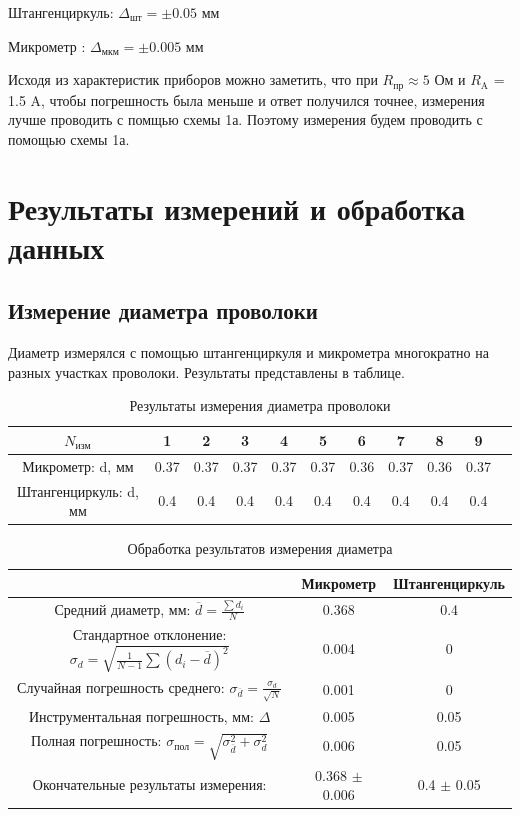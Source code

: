 \documentclass[a4paper,12pt]{article}
\begin{document}
Штангенциркуль: $\Delta_{\mbox{шт}} = \pm 0.05$ мм

Микрометр : $\Delta_{\mbox{мкм}} = \pm 0.005$ мм

Исходя из характеристик приборов можно заметить, что при $R_{\mbox{пр}}
\approx 5$ Ом и $R_{\mbox{A}}$ = 1.5 A, чтобы погрешность была меньше и ответ получился точнее, измерения лучше проводить с помщью схемы 1а.
Поэтому измерения будем проводить с помощью схемы 1а.

\section{Результаты измерений и обработка данных}
\subsection{Измерение диаметра проволоки}
Диаметр измерялся с помощью штангенциркуля и микрометра многократно на разных участках проволоки. Результаты представлены в таблице.
\begin{table}[H]
\label{Диаметр}
\caption{Результаты измерения диаметра проволоки}
\begin{tabular}{|c|c|c|c|c|c|c|c|c|c|c|}
\hline
$N_{\mbox{изм}}$ & 1 & 2 & 3 & 4 & 5 & 6 & 7 & 8 & 9\\
\hline
Микрометр: d, мм & 0.37 & 0.37 & 0.37 & 0.37 & 0.37 & 0.36 & 0.37 & 0.36 & 0.37 \\
\hline
Штангенциркуль: d, мм & 0.4 & 0.4 & 0.4 & 0.4 & 0.4 & 0.4 & 0.4 & 0.4 & 0.4 \\
\hline
\end{tabular}
\end{table}

\begin{table}[H]
\centering
\caption{Обработка результатов измерения диаметра}
\begin{tabular}{|c|c|c|}
\hline
 & Микрометр & Штангенциркуль \\
\hline
Средний диаметр, мм: $\overline{d}=\frac{\sum d_i}{N}$ & 0.368 & 0.4 \\
\hline
Стандартное отклонение: $\sigma_d=\sqrt{\frac{1}{N-1}\sum (d_i-\overline{d})^2}$ & 0.004&0 \\
\hline
Случайная погрешность среднего: $\sigma_{\overline{d}}=\frac{\sigma_d}{\sqrt{N}}$ & 0.001 & 0 \\
\hline
Инструментальная погрешность, мм: $\Delta$ & 0.005 & 0.05 \\
\hline
Полная погрешность: $\sigma_{\mbox{пол}}=\sqrt{\sigma_{\overline{d}}^2+\sigma_d^2}$ & 0.006 & 0.05 \\
\hline
Окончательные результаты измерения:  & 0.368 $\pm$ 0.006 & 0.4 $\pm$ 0.05 \\
\hline
\end{tabular}
\end{table}
\end{document}
